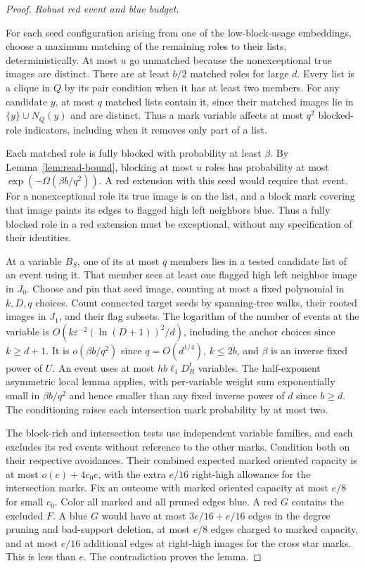 \documentclass[11pt]{amsart}
\theoremstyle{definition}
\theoremstyle{remark}
\numberwithin{equation}{section}
\begin{document}
\begin{proof}
\medskip\noindent\emph{Robust red event and blue budget.}

For each seed configuration arising from one of the low-block-usage embeddings, choose a maximum matching of the remaining roles to their lists, deterministically. At most $u $ go unmatched because the nonexceptional true images are distinct. There are at least $ b/2$ matched roles for large $ d $. Every list is a clique in $ Q $ by its pair condition when it has at least two members. For any candidate $ y $, at most $ q $ matched lists contain it, since their matched images lie in $\{y\}\cup N_Q(y)$ and are distinct. Thus a mark variable affects at most $ q^2$ blocked-role indicators, including when it removes only part of a list.

Each matched role is fully blocked with probability at least $\beta $. By Lemma~\ref{lem:read-bound}, blocking at most $ u $ roles has probability at most $\exp(-\Omega(\beta b/q^2))$. A red extension with this seed would require that event. For a nonexceptional role its true image is on the list, and a block mark covering that image paints its edges to flagged high left neighbors blue. Thus a fully blocked role in a red extension must be exceptional, without any specification of their identities.

At a variable $B_S $, one of its at most $ q $ members lies in a tested candidate list of an event using it. That member sees at least one flagged high left neighbor image in $ J_0$. Choose and pin that seed image, counting at most a fixed polynomial in $ k,D,q $ choices. Count connected target seeds by spanning-tree walks, their rooted images in $ J_1$, and their flag subsets. The logarithm of the number of events at the variable is $ O(k\varepsilon^{-2}(\ln(D+1))^2/d)$, including the anchor choices since $ k\ge d+1$. It is $ o(\beta b/q^2)$ since $ q=O(d^{1/4})$, $ k\le2b $, and $\beta $ is an inverse fixed power of $ U $. An event uses at most $ hb\ell_1 D_R^t $ variables. The half-exponent asymmetric local lemma applies, with per-variable weight sum exponentially small in $\beta b/q^2$ and hence smaller than any fixed inverse power of $ d $ since $ b\ge d$. The conditioning raises each intersection mark probability by at most two.

The block-rich and intersection tests use independent variable families, and each excludes its red events without reference to the other marks. Condition both on their respective avoidances. Their combined expected marked oriented capacity is at most $o(e)+4c_0e $, with the extra $ e/16$ right-high allowance for the intersection marks. Fix an outcome with marked oriented capacity at most $ e/8$ for small $ c_0$. Color all marked and all pruned edges blue. A red $ G $ contains the excluded $ F $. A blue $ G $ would have at most $3e/16+e/16$ edges in the degree pruning and bad-support deletion, at most $ e/8$ edges charged to marked capacity, and at most $ e/16$ additional edges at right-high images for the cross star marks. This is less than $ e$. The contradiction proves the lemma.

\end{proof}
\end{document}
